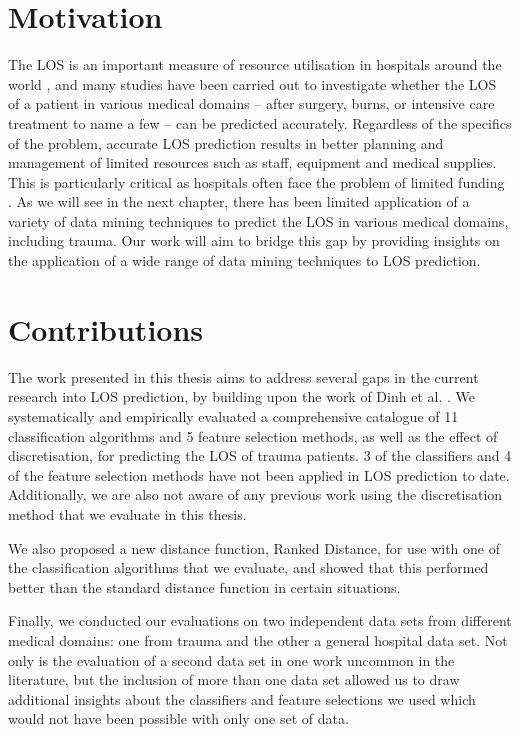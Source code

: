 \section{Motivation}
The LOS is an important measure of resource utilisation in hospitals around
the world \citep{Ng2006},
and many studies have been carried out to investigate whether the
LOS of a patient in various medical domains -- after surgery, burns, or
intensive care treatment to name a few -- can be predicted accurately.
Regardless of the
specifics of the problem, accurate LOS prediction results in better planning
and management of limited resources such as staff, equipment and medical
supplies. This is particularly critical as hospitals often face the problem
of limited funding \citep{Walczak2003}.
As we will see in the next chapter, there has been limited
application of a variety of data mining techniques to predict the LOS in
various medical domains, including trauma. Our work will aim to bridge this
gap by providing insights on the application of a wide range of data mining
techniques to LOS prediction.

\section{Contributions}
The work presented in this thesis aims to address several gaps in the current
research into LOS prediction, by building upon the work of Dinh et al.
\citep{Dinh2013a}. We systematically and empirically evaluated a comprehensive
catalogue of 11 classification
algorithms and 5 feature selection methods, as well as the effect of
discretisation, for predicting the LOS of trauma patients. 3 of the
classifiers and 4 of the feature selection methods have not been applied in
LOS prediction to date. Additionally, we are also not aware of any previous
work using the discretisation method that we evaluate in this thesis.

We also proposed a new distance function, Ranked Distance, for use with one
of the classification algorithms that we evaluate, and showed that this
performed better than the standard distance function in certain situations.

Finally, we conducted our evaluations on two independent data sets from
different medical domains: one from trauma and the other a general hospital
data set. Not only is the evaluation of a second data set in one work
uncommon in the literature, but the inclusion of more than one data set
allowed us to draw additional insights about the classifiers and feature
selections we used which would not have been possible with only one set of
data.

